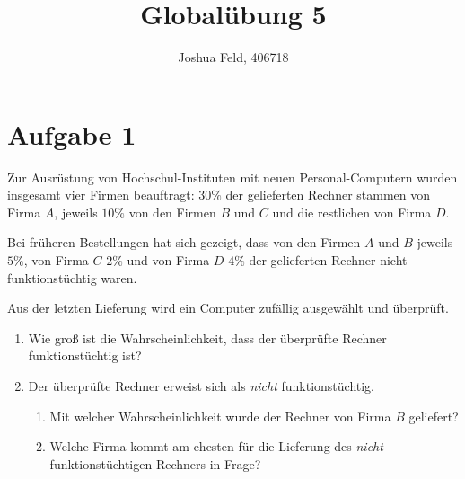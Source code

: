 \documentclass{exercise}
\institute{Institut für Statistik und Wirtschaftsmathematik}
\title{Globalübung 5}
\author{Joshua Feld, 406718}
\begin{document}
    \maketitle


    \section*{Aufgabe 1}

    \begin{problem}
        Zur Ausrüstung von Hochschul-Instituten mit neuen Personal-Computern wurden insgesamt vier Firmen beauftragt: \(30\%\) der gelieferten Rechner stammen von Firma \(A\), jeweils \(10\%\) von den Firmen \(B\) und \(C\) und die restlichen von Firma \(D\).
        
        Bei früheren Bestellungen hat sich gezeigt, dass von den Firmen \(A\) und \(B\) jeweils \(5\%\), von Firma \(C\) \(2\%\) und von Firma \(D\) \(4\%\) der gelieferten Rechner nicht funktionstüchtig waren.
        
        Aus der letzten Lieferung wird ein Computer zufällig ausgewählt und überprüft.
        \begin{enumerate}
            \item Wie groß ist die Wahrscheinlichkeit, dass der überprüfte Rechner funktionstüchtig ist?
            \item Der überprüfte Rechner erweist sich als \emph{nicht} funktionstüchtig.
            \begin{enumerate}
                \item Mit welcher Wahrscheinlichkeit wurde der Rechner von Firma \(B\) geliefert?
                \item Welche Firma kommt am ehesten für die Lieferung des \emph{nicht} funktionstüchtigen Rechners in Frage?
            \end{enumerate}
        \end{enumerate}
    \end{problem}
\end{document}
